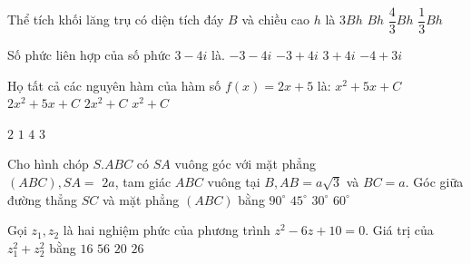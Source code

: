 \begin{ex}%
Thể tích khối lăng trụ có diện tích đáy $B$ và chiều cao $h$ là
\choice
{$3 B h$}
{\True $Bh$}
{$\dfrac{4}{3} B h$}
{$\dfrac{1}{3} B h$}

\end{ex}
\begin{ex}%
Số phức liên hợp của số phức $3-4 i$ là.
\choice
{$-3-4 i$}
{$-3+4 i$}
{\True $3+4 i$}
{$-4+3 i$}

\end{ex}
\begin{ex}%
{

}

\end{ex}
\begin{ex}%
Họ tất cả các nguyên hàm của hàm số $f(x)=2 x+5$ là:
\choice
{\True $x^2+5 x+C$}
{$2 x^2+5 x+C$}
{$2 x^2+C$}
{$x^2+C$}

\end{ex}
\begin{ex}%
{\vspace{-0.5cm}
}
\choice
{$2$}
{$1$}
{\True $4$}
{$3$}
\end{ex}
\begin{ex}%
Cho hình chóp $S.ABC$ có $SA$ vuông góc với mặt phẳng\\ $(ABC), SA=$ $2 a$, tam giác $ABC$ vuông tại $B, AB=a \sqrt{3}$ và $BC=a$. Góc giữa đường thẳng $SC$ và mặt phẳng $(ABC)$ bằng
\choice
{$90^{\circ}$}
{\True $45^{\circ}$}
{$30^{\circ}$}
{$60^{\circ}$}

\end{ex}
\begin{ex}%
Gọi $z_1, z_2$ là hai nghiệm phức của phương trình $z^2-6 z+10=0$. Giá trị của $z_1^2+z_2^2$ bằng
\choice
{\True $16$}
{$56$}
{$20$}
{$26$}

\end{ex}
